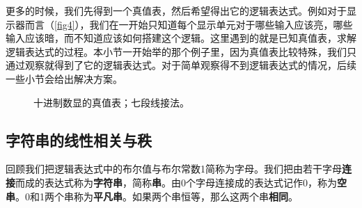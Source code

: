 更多的时候，我们先得到一个真值表，然后希望得出它的逻辑表达式。例如对于显示器而言（\autoref{fig4}），我们在一开始只知道每个显示单元对于哪些输入应该亮，哪些输入应该暗，而不知道应该如何搭建这个逻辑。这里遇到的就是已知真值表，求解逻辑表达式的过程。本小节一开始举的那个例子里，因为真值表比较特殊，我们只通过观察就得到了它的逻辑表达式。对于简单观察得不到逻辑表达式的情况，后续一些小节会给出解决方案。
\begin{figure}
\centering
{}\qquad
{}
\caption{\protect{}十进制数显的真值表；\protect{}七段线接法。}\label{fig4}
\end{figure}

\subsection{字符串的线性相关与秩}
回顾我们把逻辑表达式中的布尔值与布尔常数1简称为字母。我们把由若干字母\textbf{连接}而成的表达式称为\textbf{字符串}，简称\textbf{串}。由0个字母连接成的表达式记作0，称为\textbf{空串}。0和1两个串称为\textbf{平凡串}。如果两个串恒等，那么这两个串\textbf{相同}。

